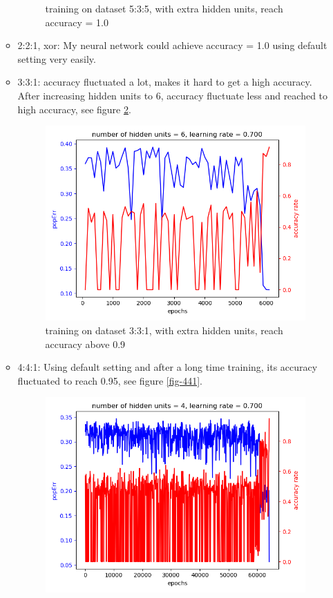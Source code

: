 \documentclass[11pt]{article}
\begin{document}
\begin{enumerate}
\begin{itemize}
\begin{figure}[htb]
\caption{training on dataset 5:3:5, with extra hidden units, reach accuracy = 1.0 \label{fig-535}}
\end{figure}
\item 2:2:1, xor: My neural network could achieve accuracy = 1.0  using default setting very easily.
\item 3:3:1: accuracy fluctuated a lot, makes it hard to get a high accuracy. After increasing hidden units to 6, accuracy fluctuate less and reached to high accuracy, see figure \ref{fig-331}.
\begin{figure}[htb]
\centering
\includegraphics[width=.9\linewidth]{./popErr_vs_accuracy_on_331_dataset.png}
\caption{training on dataset 3:3:1, with extra hidden units, reach accuracy above 0.9 \label{fig-331}}
\end{figure}
\item 4:4:1: Using default setting and after a long time training, its accuracy fluctuated to reach 0.95, see figure \ref{fig-441}.
\begin{figure}[htb]
\centering
\includegraphics[width=.9\linewidth]{./popErr_vs_accuracy_on_441.png}

\end{figure}
\end{itemize}
\end{enumerate}
\end{document}
